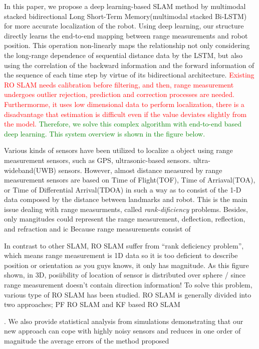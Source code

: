 \documentclass{ieeeaccess}
\begin{document}
In this paper, we propose a deep learning-based SLAM method by multimodal stacked bidirectional Long Short-Term Memory(multimodal stacked Bi-LSTM) for more accurate localization of the robot. Using deep learning, our structure directly learns the end-to-end mapping between range measurements and robot position. This operation non-linearly maps the relationship not only considering the long-range dependence of sequential distance data by the LSTM, but also using the correlation of the backward information and the forward information of the sequence of each time step by virtue of its bidirectional architecture. \textcolor{red}{Existing RO SLAM needs calibration before filtering, and then, range measurement undergoes outlier rejection, prediction and correction processes are needed.	Furthermorme, it uses low dimensional data to perform localization, there is a disadvantage that estimation is difficult even if the value deviates slightly from the model.} \textcolor{green}{Therefore, we solve this complex algorithm with end-to-end based deep learning. This system overview is shown in the figure below.}

 Various kinds of sensors have been utilized to localize a object using range measurement sensors, such as GPS, ultrasonic-based sensors. ultra-wideband(UWB) sensors. However, almost distance measured by range measurement sensors are based on Time of Flight(TOF), Time of Arriaval(TOA)\cite{jung2011indoor}, or Time of Differential Arrival(TDOA) in such a way as to consist of the 1-D data composed by the distance between landmarks and robot. This is the main issue dealing with range measurments, called \textit{rank-dificiency} problems. Besides, only mangitudes could represent the range measurement, deflection, reflection, and refraction and ic  Because range measurements consist of    


In contrast to other SLAM, RO SLAM suffer from “rank deficiency problem”, which means range measurement is 1D data so it is too deficient to describe position or orientation as you guys knows, it only has magnitude. As this figure shown, in 3D, posiibility of location of sensor is distributed over sphere / since range measurement doesn’t contain direction information!
To solve this problem, various type of RO SLAM has been studied. RO SLAM is generally divided into two approaches; PF RO SLAM and KF based RO SLAM

. We also provide statistical analysis from simulations demonstrating that
our new approach can cope with highly noisy sensors and
reduces in one order of magnitude the average errors of the
method proposed
\end{document}
